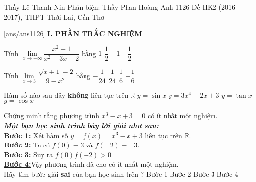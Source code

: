 \begin{name}
{Thầy Lê Thanh Nin \newline
 Phản biện: Thầy Phan Hoàng Anh}
{1126 Đề HK2 (2016-2017), THPT Thới Lai, Cần Thơ}
	\end{name}
	\setcounter{ex}{0}\setcounter{bt}{0}
	[ans/ans1126]
\noindent\textbf{I. PHẦN TRẮC NGHIỆM}
\begin{ex}%
	Tính $ \lim\limits_{x \to +\infty}\dfrac{x^2-1}{x^2+3x+2} $ bằng
	\choice
	{\True $1$}
	{$\dfrac{1}{2}$}
	{$-1$}
	{$-\dfrac{1}{2}$}
\end{ex}

\begin{ex}%
	Tính $ \lim\limits_{x \to 3}\dfrac{\sqrt{x+1}-2}{9-x^2} $ bằng
	\choice
	{\True $-\dfrac{1}{24}$}
	{$\dfrac{1}{24}$}
	{$\dfrac{1}{6}$}
	{$-\dfrac{1}{6}$}
\end{ex}


\begin{ex}%
	Hàm số nào sau đây \textbf{không} liên tục trên $ \mathbb{R} $
	\choice
	{$y=\sin x$}
	{$y=3x^4-2x+3$}
	{\True $y=\tan x$}
	{$y=\cos x$}
\end{ex}


\begin{ex}%
	Chứng minh rằng phương trình $ x^3-x+3=0 $ có ít nhất một nghiệm.\\
	\textbf{\textit{Một bạn học sinh trình bày lời giải như sau:}}	\\
	\textbf{\underline{Bước 1:}} Xét hàm số $ y=f(x) =x^3-x+3 $ liên tục trên $ \mathbb{R} $.\\
	\textbf{\underline{Bước 2:}} Ta có $ f(0)=3  $ và $ f(-2) =-3$.\\
	\textbf{\underline{Bước 3:}} Suy ra $ f(0)f(-2)>0 $\\
	\textbf{\underline{Bước 4:}}Vậy phương trình đã cho có ít nhất một nghiệm.\\
	Hãy tìm bước giải \textbf{sai} của bạn học sinh trên ?
	\choice
	{Bước 1}
	{Bước 2}
	{\True Bước 3}
	{Bước 4}
\end{ex}




